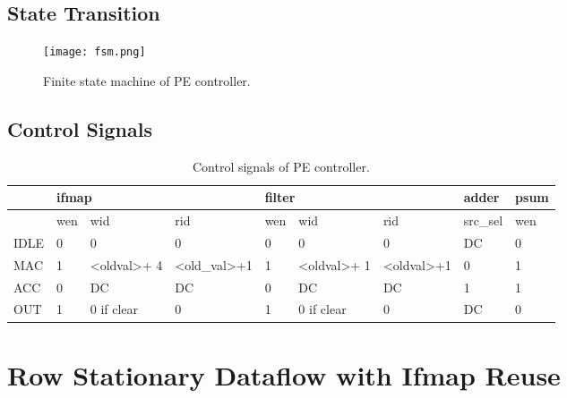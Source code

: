 \documentclass[12pt]{article}
\begin{document}
\subsection*{State Transition}
\begin{figure}[h]
    \centering
    \texttt{[image: fsm.png]}
    \caption{Finite state machine of PE controller.}
    \label{fig:fsm}
\end{figure}

\subsection*{Control Signals}
\begin{table}[h]
    \begin{tabular}{|l|lll|lll|l|l|}
    \hline
         & \multicolumn{3}{l|}{ifmap}                                       & \multicolumn{3}{l|}{filter}                                      & adder    & psum \\ \hline
         & \multicolumn{1}{l|}{wen} & \multicolumn{1}{l|}{wid}        & rid & \multicolumn{1}{l|}{wen} & \multicolumn{1}{l|}{wid}        & rid & src\_sel & wen  \\ \hline
    IDLE & \multicolumn{1}{l|}{0}   & \multicolumn{1}{l|}{0}          & 0   & \multicolumn{1}{l|}{0}   & \multicolumn{1}{l|}{0}          & 0   & DC       & 0    \\ \hline
    MAC &
      \multicolumn{1}{l|}{1} &
      \multicolumn{1}{l|}{\textless{}oldval\textgreater + 4} &
      \textless{}old\_val\textgreater +1 &
      \multicolumn{1}{l|}{1} &
      \multicolumn{1}{l|}{\textless{}oldval\textgreater + 1} &
      \textless{}oldval\textgreater +1 &
      0 &
      1 \\ \hline
    ACC  & \multicolumn{1}{l|}{0}   & \multicolumn{1}{l|}{DC}         & DC  & \multicolumn{1}{l|}{0}   & \multicolumn{1}{l|}{DC}         & DC  & 1        & 1    \\ \hline
    OUT  & \multicolumn{1}{l|}{1}   & \multicolumn{1}{l|}{0 if clear} & 0   & \multicolumn{1}{l|}{1}   & \multicolumn{1}{l|}{0 if clear} & 0   & DC       & 0    \\ \hline
    \end{tabular}
    \caption{Control signals of PE controller.}
\end{table}

\section{Row Stationary Dataflow with Ifmap Reuse}
\end{document}
